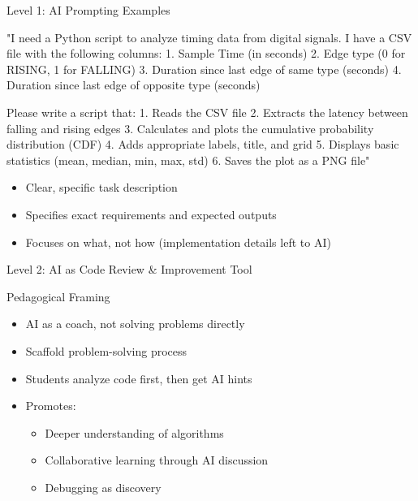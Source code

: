 \documentclass{beamer}
\begin{document}
\begin{frame}{Level 1: AI Prompting Examples}
    \begin{tcolorbox}[colback=mygreen!5,colframe=mygreen,title=Sample Prompt]
        "I need a Python script to analyze timing data from digital signals. I have a CSV file with the following columns:
        1. Sample Time (in seconds)
        2. Edge type (0 for RISING, 1 for FALLING)
        3. Duration since last edge of same type (seconds)
        4. Duration since last edge of opposite type (seconds)
        
        Please write a script that:
        1. Reads the CSV file
        2. Extracts the latency between falling and rising edges 
        3. Calculates and plots the cumulative probability distribution (CDF)
        4. Adds appropriate labels, title, and grid
        5. Displays basic statistics (mean, median, min, max, std)
        6. Saves the plot as a PNG file"
    \end{tcolorbox}
    
    \begin{itemize}
        \item Clear, specific task description 
        \item Specifies exact requirements and expected outputs
        \item Focuses on what, not how (implementation details left to AI)
    \end{itemize}
\end{frame}

\begin{frame}{Level 2: AI as Code Review \& Improvement Tool}
    \begin{block}{Pedagogical Framing}
        \begin{itemize}
            \item AI as a coach, not solving problems directly
            \item Scaffold problem-solving process
            \item Students analyze code first, then get AI hints
            \item Promotes:
                \begin{itemize}
                    \item Deeper understanding of algorithms
                    \item Collaborative learning through AI discussion
                    \item Debugging as discovery
                \end{itemize}
        \end{itemize}
    \end{block}
\end{frame}
\end{document}
